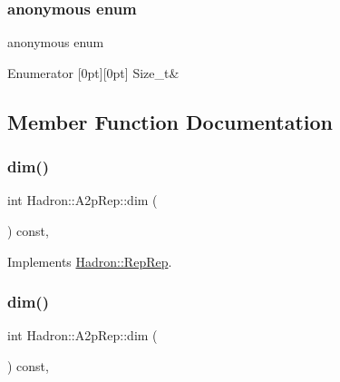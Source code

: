 \subsubsection{\texorpdfstring{anonymous enum}{anonymous enum}}
{\footnotesize\ttfamily anonymous enum}

\begin{DoxyEnumFields}{Enumerator}
[0pt][0pt]{}\mbox{\label{structHadron_1_1A2pRep_a57c65da2faa24032a036a3c2e1f8600ba2d30d4dda9e31e92800d0753a2d9514a}} 
Size\+\_\+t&\\
\hline

\end{DoxyEnumFields}


\subsection{Member Function Documentation}
\mbox{\label{structHadron_1_1A2pRep_ad62519ad376b83f6d4c434d2f2a01825}} 
\subsubsection{\texorpdfstring{dim()}{dim()}\hspace{0.1cm}{\footnotesize\ttfamily [1/5]}}
{\footnotesize\ttfamily int Hadron\+::\+A2p\+Rep\+::dim (\begin{DoxyParamCaption}{ }\end{DoxyParamCaption}) const\hspace{0.3cm}{\ttfamily [inline]}, {\ttfamily [virtual]}}



Implements \mbox{\hyperlink{structHadron_1_1RepRep_a92c8802e5ed7afd7da43ccfd5b7cd92b}{Hadron\+::\+Rep\+Rep}}.

\mbox{\label{structHadron_1_1A2pRep_ad62519ad376b83f6d4c434d2f2a01825}} 
\subsubsection{\texorpdfstring{dim()}{dim()}\hspace{0.1cm}{\footnotesize\ttfamily [2/5]}}
{\footnotesize\ttfamily int Hadron\+::\+A2p\+Rep\+::dim (\begin{DoxyParamCaption}{ }\end{DoxyParamCaption}) const\hspace{0.3cm}{\ttfamily [inline]}, {\ttfamily [virtual]}}



